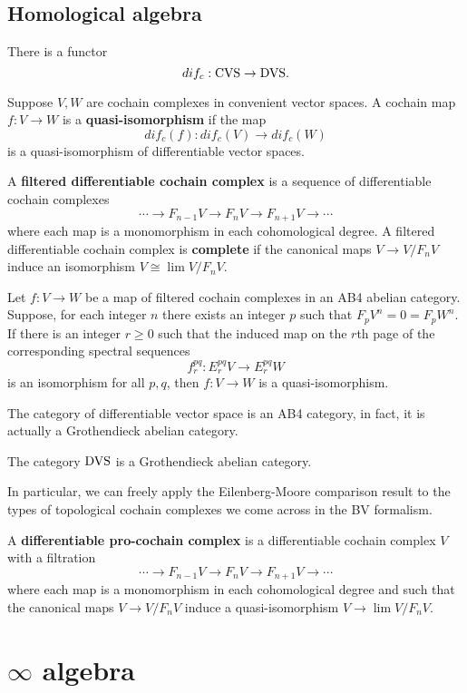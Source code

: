 \documentclass[10pt, oneside]{article}
\begin{document}
\subsection{Homological algebra}

There is a functor
\[
dif_c : {\rm CVS} \to {\rm DVS} .
\]

\begin{dfn}
Suppose $V,W$ are cochain complexes in convenient vector spaces. 
A cochain map $f : V \to W$ is a {\bf quasi-isomorphism} if the map
\[
dif_c (f) : dif_c(V) \to dif_c(W)
\]
is a quasi-isomorphism of differentiable vector spaces.
\end{dfn}

\begin{dfn}
A {\bf filtered differentiable cochain complex} is a sequence of differentiable cochain complexes
\[
\cdots \to F_{n-1} V \to F_{n} V \to F_{n+1}V \to \cdots
\]
where each map is a monomorphism in each cohomological degree. 
A filtered differentiable cochain complex is {\bf complete} if the canonical maps $V \to V / F_n V$ induce an isomorphism $V \cong \lim V / F_n V$. 
\end{dfn}

\begin{thm}
Let $f : V \to W$ be a map of filtered cochain complexes in an AB4 abelian category.
Suppose, for each integer $n$ there exists an integer $p$ such that $F_p V^n = 0 = F_p W^n$.
If there is an integer $r \geq 0$ such that the induced map on the $r$th page of the corresponding spectral sequences 
\[
f_r^{pq} :  E_r^{pq} V \to E_r^{pq} W
\]
is an isomorphism for all $p,q$, then $f : V \to W$ is a quasi-isomorphism. 
\end{thm}

The category of differentiable vector space is an AB4 category, in fact, it is actually a Grothendieck abelian category. 

\begin{thm}
The category ${\rm DVS}$ is a Grothendieck abelian category.
\end{thm}

In particular, we can freely apply the Eilenberg-Moore comparison result to the types of topological cochain complexes we come across in the BV formalism. 

\begin{dfn}
A {\bf differentiable pro-cochain complex} is a differentiable cochain complex $V$ with a filtration
\[
\cdots \to F_{n-1} V \to F_{n} V \to F_{n+1}V \to \cdots
\]
where each map is a monomorphism in each cohomological degree and such that the canonical maps $V \to V / F_n V$ induce a quasi-isomorphism $V \to \lim V / F_n V$. 
\end{dfn}

\section{$\infty$ algebra}

\end{document}
